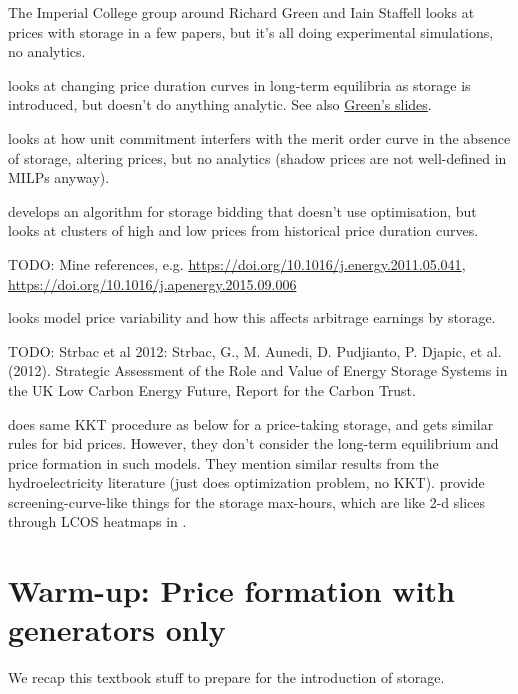 \documentclass[final,3p,times]{elsarticle}
\begin{document}
The Imperial College group around Richard Green and Iain Staffell looks at prices with storage in a few papers, but it's all doing experimental simulations, no analytics.

\cite{Green2015} looks at changing price duration curves in long-term equilibria as storage is introduced, but doesn't do anything analytic. See also \href{https://spiral.imperial.ac.uk/handle/10044/1/51138}{Green's slides}.


\cite{Staffell2016} looks at how unit commitment interfers with the merit order curve in the absence of storage, altering prices, but no analytics (shadow prices are not well-defined in MILPs anyway).

\cite{Ward2018} develops an algorithm for storage bidding that doesn't use optimisation, but looks at clusters of high and low prices from historical price duration curves.

TODO: Mine \cite{Ward2018} references, e.g. \url{https://doi.org/10.1016/j.energy.2011.05.041}, \url{https://doi.org/10.1016/j.apenergy.2015.09.006}

\cite{Ward2019} looks model price variability and how this affects arbitrage earnings by storage.

TODO: Strbac et al 2012: Strbac, G., M. Aunedi, D. Pudjianto, P. Djapic, et al. (2012). Strategic Assessment of the Role and Value of
Energy Storage Systems in the UK Low Carbon Energy Future, Report for the Carbon Trust.

\cite{CRAMPES2019100746} does same KKT procedure as below for a price-taking storage, and gets similar rules for bid prices. However, they don't consider the long-term equilibrium and price formation in such models. They mention similar results from the hydroelectricity literature \cite{lederer1984overall} (just does optimization problem, no KKT). \cite{CRAMPES2019100746} provide screening-curve-like things for the storage max-hours, which are like 2-d slices through LCOS heatmaps in \cite{schmidtmelchior2019}.




\section{Warm-up: Price formation with generators only}\label{sec:generators}

We recap this textbook stuff to prepare for the introduction of storage.
\end{document}
